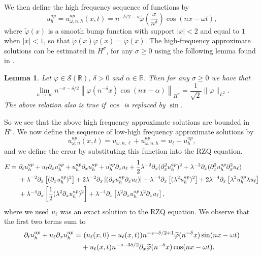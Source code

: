 \documentclass[reqno]{amsart}
\theoremstyle{plain}
\newtheorem{lemma}{Lemma}[section]
\numberwithin{equation}{section}
\begin{document}
   
We then define the high frequency sequence of functions by
$$
u_{ h} ^{ap} = u_{\omega, n, h} ^{ap} (x,t) = n^{-\delta/2-s} \widetilde \varphi \left( \frac{x}{n^\delta} \right) \cos(nx-\omega t), 
$$
where $\widetilde \varphi (x)$ is a smooth bump function with support $|x|<  2$ and equal to $1$ when $|x|<1$, so that $\widetilde \varphi (x) \varphi (x)  =\widetilde \varphi (x) $. 
The high-frequency approximate solutions can be estimated in $H^\sigma$, for any $\sigma\ge 0$ using the following lemma found in \cite{himonas2009euler}. 
\begin{lemma}\label{hk2009}
Let $\varphi \in \mathcal S(\mathbb R)$, $\delta > 0$ and $\alpha \in \mathbb R$. Then for any $\sigma \ge 0 $ we have that 
$$
\lim_{n\rightarrow \infty} n^{-\sigma-\delta/2} \left \| \varphi \left( n^{-\delta} x\right) \cos(nx-\alpha) \right\| _{H^\sigma} = \frac{1}{\sqrt{2}} \| \varphi\|_{L^2} .
$$
The above relation also is true if $\cos$ is replaced by $\sin$.
\end{lemma}
So we see that the above high frequency approximate solutions are bounded in $H^s$. We now 
  define the sequence of low-high frequency approximate solutions by 
$$
u_{\omega, n} ^{ap} (x,t) =   u_{\omega, n,  \ell}  + u_{\omega, n, h} ^{ap}  = u_\ell+u_h^{ap} , 
$$
and we define the error by substituting this function into the RZQ equation. 
\begin{align}
E = \ &  \notag
\partial_t  u_h^{ap} + u_\ell \partial_x u_h^{ap}  +  u_h^{ap} \partial_x  u_h^{ap} + u_h^{ap} \partial_x u_\ell + 
 \frac12 \lambda^{-2} \partial_x ( \partial_x ^2 u_h^{ap} )^2 +  \lambda^{-2} \partial_x ( \partial_x ^2 u_h^{ap} \partial_x ^2 u_\ell ) 
\\ &   \notag
+ \lambda^{-2}  \partial_x \left [(\partial_x u_h ^{ap}  )^2   \right ]  + 2 \lambda^{-2}  \partial_x \left [(\partial_x u_h ^{ap} \partial_x u_\ell )    \right ]  
 + \lambda^{-4} \partial_x \left [  ( \lambda^2    u_h ^{ap}  )^2    \right ] 
 + 2 \lambda^{-4} \partial_x \left [  \lambda ^2   u_h ^{ap}   \lambda    u_\ell   \right ]  
\\ &
  +  \lambda^{-4} \partial_x  \left [  \frac12 (\lambda ^2 \partial_ x u_h^{ap}  )^2 
   \right ]  
     +  \lambda^{-4} \partial_x  \left [    \lambda ^2\partial_ x u_h^{ap}  \lambda ^2 \partial_ x u_\ell     \right ]  ,
\end{align}
where we used $u_\ell$ was an exact solution to the RZQ equation. 
We observe that the first two terms sum to 
\begin{align}\notag
\partial_t  u_h^{ap} + u_\ell \partial_x u_h^{ap} = &\ (u_\ell(x,0) - u_\ell(x,t) ) n^{-s-\delta/2 +1 } \widetilde \varphi(n^{-\delta } x) \sin(nx-\omega t) 
\\
& + u_\ell(x,t) n^{-s-3\delta/2}  \partial_x \widetilde \varphi (n^{-\delta }x) \cos(nx-\omega t) . 
\end{align}
\end{document}
